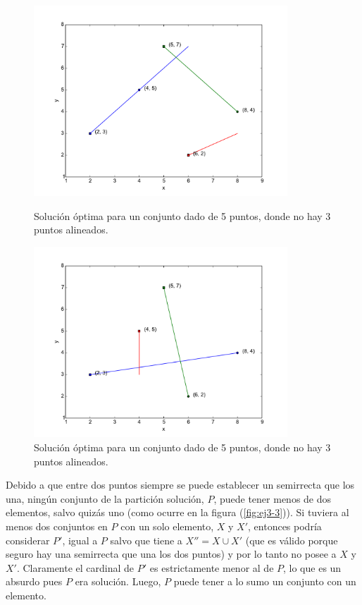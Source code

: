 \begin{figure}[H]
  \centering
  \begin{minipage}{0.49\textwidth}
  \includegraphics[width=0.85\textwidth]{img/ejemplos/ej3-3.pdf}
  \caption{\footnotesize Solución óptima para un conjunto dado de 5 puntos, donde no hay 3 puntos alineados.}
  \label{fig:ej3-3}
  \end{minipage}%
  \hspace{0.01\textwidth}
  \begin{minipage}{0.49\textwidth}
  \includegraphics[width=0.85\textwidth]{img/ejemplos/ej3-4.pdf}
  \caption{\footnotesize Solución óptima para un conjunto dado de 5 puntos, donde no hay 3 puntos alineados.}
  \label{fig:ej3-4}
  \end{minipage}%
\end{figure}

Debido a que entre dos puntos siempre se puede establecer un semirrecta que los una, ningún conjunto de la partición solución, $P$, puede tener menos de dos elementos, salvo quizás uno (como ocurre en la figura (\ref{fig:ej3-3})). Si tuviera al menos dos conjuntos en $P$ con un solo elemento, $X$ y $X'$, entonces podría considerar $P'$, igual a $P$ salvo que tiene a $X'' = X \cup X'$ (que es válido porque seguro hay una semirrecta que una los dos puntos) y por lo tanto no posee a $X$ y $X'$. Claramente el cardinal de $P'$ es estrictamente menor al de $P$, lo que es un absurdo pues $P$ era solución. Luego, $P$ puede tener a lo sumo un conjunto con un elemento.

